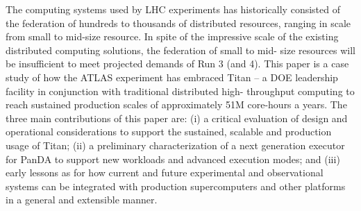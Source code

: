 The computing systems used by LHC experiments has historically consisted of
the federation of hundreds to thousands of distributed resources, ranging in
scale from small to mid-size resource.  In spite of the impressive scale of
the existing distributed computing solutions, the federation of small to mid-
size resources will be insufficient to meet projected demands of Run 3 (and
4). This paper is a case study of how the ATLAS experiment has embraced Titan
-- a DOE leadership facility in conjunction with traditional distributed high-
throughput computing to reach sustained production scales of approximately 51M
core-hours a years. The three main contributions of this paper are:  (i) a
critical evaluation of design and operational considerations  to support the
sustained, scalable and production usage of Titan;  (ii) a preliminary
characterization of a next generation executor for PanDA to support new
workloads and  advanced execution modes; and (iii) early lessons as  for how
current and future experimental and observational systems can be integrated
with production supercomputers and other platforms in a general and extensible
manner.
